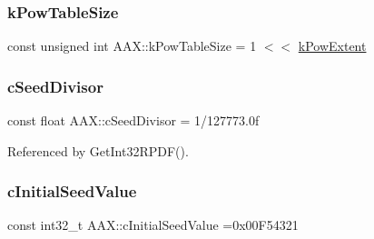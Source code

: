 \subsubsection{\texorpdfstring{kPowTableSize}{kPowTableSize}}
{\footnotesize\ttfamily const unsigned int A\+A\+X\+::k\+Pow\+Table\+Size = 1 $<$$<$ \mbox{\hyperlink{a00852_a4e6fcac015bb083018e8897563966cf6}{k\+Pow\+Extent}}}

\mbox{\label{a00852_a0c975151f0d47cc80eef9ff5a7c80125}} 
\subsubsection{\texorpdfstring{cSeedDivisor}{cSeedDivisor}}
{\footnotesize\ttfamily const float A\+A\+X\+::c\+Seed\+Divisor = 1/127773.\+0f}



Referenced by Get\+Int32\+R\+P\+D\+F().

\mbox{\label{a00852_a143d659ccb62ae0807e9902e751b14cf}} 
\subsubsection{\texorpdfstring{cInitialSeedValue}{cInitialSeedValue}}
{\footnotesize\ttfamily const int32\+\_\+t A\+A\+X\+::c\+Initial\+Seed\+Value =0x00\+F54321}

